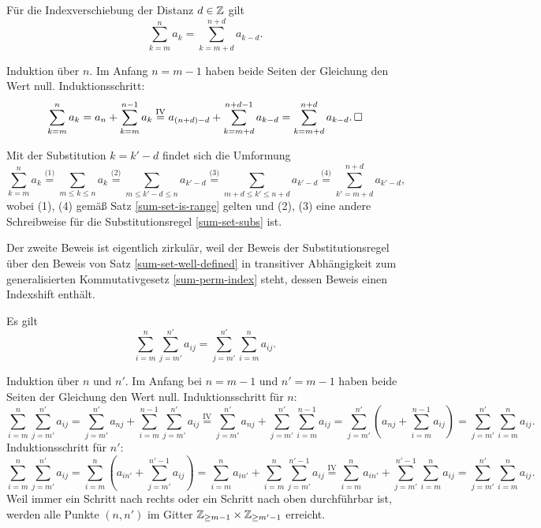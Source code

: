 \begin{Satz}[Indexshift]\label{sum-indexshift}\newlinefirst
Für die Indexverschiebung der Distanz $d\in\mathbb Z$ gilt
\[\textstyle\sum_{k=m}^n a_k = \sum_{k=m+d}^{n+d} a_{k-d}.\]
\end{Satz}
\begin{Beweis}[Beweis 1]
Induktion über $n$. Im Anfang $n = m-1$ haben beide Seiten
der Gleichung den Wert null. Induktionsschritt:
\[\sum_{k=m}^n a_k = a_n+\sum_{k=m}^{n-1}a_k \stackrel{\mathrm{IV}}=
a_{(n+d)-d}+\sum_{k=m+d}^{n+d-1}a_{k-d}
= \sum_{k=m+d}^{n+d}a_{k-d}.\,\square\]
\end{Beweis}
\begin{Beweis}[Beweis 2]
Mit der Substitution $k=k'-d$ findet sich die Umformung
\[\sum_{k=m}^n a_k \stackrel{\text{(1)}}= \sum_{m\le k\le n} a_k
\stackrel{\text{(2)}}= \sum_{m\le k'-d\le n} a_{k'-d}
\stackrel{\text{(3)}}= \sum_{m+d\le k'\le n+d} a_{k'-d}
\stackrel{\text{(4)}}= \sum_{k'=m+d}^{n+d} a_{k'-d},\]
wobei (1), (4) gemäß Satz \ref{sum-set-is-range} gelten
und (2), (3) eine andere Schreibweise für die Substitutionsregel
\ref{sum-set-subs} ist.\,\qedsymbol
\end{Beweis}
 Der zweite Beweis ist eigentlich zirkulär,
weil der Beweis der Substitutionsregel über den Beweis von
Satz \ref{sum-set-well-defined} in transitiver Abhängigkeit zum
generalisierten Kommutativgesetz \ref{sum-perm-index} steht, dessen
Beweis einen Indexshift enthält.

\begin{Satz} Es gilt
\[\sum_{i=m}^n \sum_{j=m'}^{n'} a_{ij} = \sum_{j=m'}^{n'}\sum_{i=m}^n a_{ij}.\]
\end{Satz}
\begin{Beweis}
Induktion über $n$ und $n'$. Im Anfang bei $n=m-1$ und $n'=m-1$
haben beide Seiten der Gleichung den Wert null. Induktionsschritt für $n$:
\[\sum_{i=m}^n\sum_{j=m'}^{n'} a_{ij}
= \!\!\sum_{j=m'}^{n'} a_{nj}
+ \!\sum_{i=m}^{n-1}\sum_{j=m'}^{n'} a_{ij}
\stackrel{\mathrm{IV}}=
\!\sum_{j=m'}^{n'} a_{nj}
+ \!\sum_{j=m'}^{n'}\sum_{i=m}^{n-1} a_{ij}
= \!\!\sum_{j=m'}^{n'} (a_{nj}+\sum_{i=m}^{n-1} a_{ij})
= \!\!\sum_{j=m'}^{n'} \sum_{i=m}^n a_{ij}.\]
Induktionsschritt für $n'$:
\[\sum_{i=m}^n\sum_{j=m'}^{n'} a_{ij}
= \!\!\sum_{i=m}^n (a_{in'}+\!\!\sum_{j=m'}^{n'-1}a_{ij})
= \!\!\sum_{i=m}^n a_{in'}+\!\!\sum_{i=m}^n\sum_{j=m'}^{n'-1}a_{ij}
\stackrel{\mathrm{IV}}=
\!\sum_{i=m}^n a_{in'}+\sum_{j=m'}^{n'-1}\sum_{i=m}^n a_{ij}
= \!\!\sum_{j=m'}^{n'}\sum_{i=m}^n a_{ij}.\]
Weil immer ein Schritt nach rechts oder ein Schritt nach oben durchführbar ist,
werden alle Punkte $(n,n')$ im Gitter $\mathbb Z_{\ge m-1}\times\mathbb Z_{\ge m'-1}$ erreicht.\,\qedsymbol
\end{Beweis}


